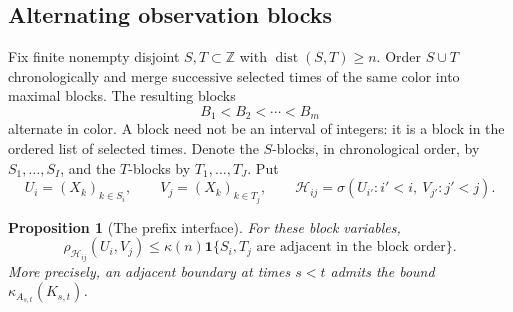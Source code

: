 \documentclass[11pt]{amsart}
\numberwithin{equation}{section}
\newtheorem{proposition}[theorem]{Proposition}
\theoremstyle{definition}
\newcommand{\ZZ}{\mathbb Z}
\newcommand{\cH}{\mathcal H}
\newcommand{\dist}{\operatorname{dist}}
\newcommand{\ind}{\mathbf 1}
\begin{document}
\subsection{Alternating observation blocks}
Fix finite nonempty disjoint $S,T\subset\ZZ$ with $\dist(S,T)\ge n$. Order $S\cup T$ chronologically and merge successive selected times of the same color into maximal blocks. The resulting blocks
\[
B_1<B_2<\cdots<B_m
\]
alternate in color. A block need not be an interval of integers: it is a block in the ordered list of selected times. Denote the $S$-blocks, in chronological order, by $S_1,\ldots,S_I$, and the $T$-blocks by $T_1,\ldots,T_J$. Put
\[
U_i=(X_k)_{k\in S_i},\qquad V_j=(X_k)_{k\in T_j},
\qquad
\cH_{ij}=\sigma(U_{i'}:i'<i,\ V_{j'}:j'<j).
\]

\begin{proposition}[The prefix interface]\label{prop:prefix}
For these block variables,
\begin{equation}\label{eq:prefix}
\rho_{\cH_{ij}}(U_i,V_j)
\le\kappa(n)\ind\{S_i,T_j\text{ are adjacent in the block order}\}.
\end{equation}
More precisely, an adjacent boundary at times $s<t$ admits the bound $\kappa_{A_{s,t}}(K_{s,t})$.
\end{proposition}
\end{document}
